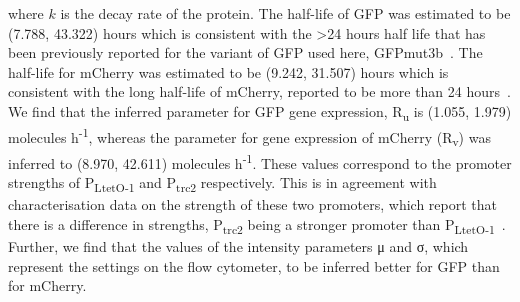 \noindent where $k$ is the decay rate of the protein. The half-life of GFP was estimated to be (7.788, 43.322) hours which is consistent with the \textgreater 24 hours half life that has been previously reported for the variant of GFP used here, GFPmut3b~\autocite{Andersen:1998tn}. The half-life for mCherry was estimated to be (9.242, 31.507) hours which is consistent with the long half-life of mCherry, reported to be more than 24 hours~\autocite{Shaner:2004vy}. We find that the inferred parameter for GFP gene expression, R\textsubscript{u} is (1.055, 1.979) molecules h\textsuperscript{-1}, whereas the parameter for gene expression of mCherry (R\textsubscript{v}) was inferred to (8.970, 42.611) molecules h\textsuperscript{-1}. These values correspond to the promoter strengths of P\textsubscript{LtetO-1} and P\textsubscript{trc2} respectively. This is in agreement with characterisation data on the strength of these two promoters, which report that there is a difference in strengths, P\textsubscript{trc2} being a stronger promoter than P\textsubscript{LtetO-1}~\autocite{Litcofsky:2012gr}. Further, we find that the values of the intensity parameters μ and σ, which represent the settings on the flow cytometer, to be inferred better for GFP than for mCherry. 




